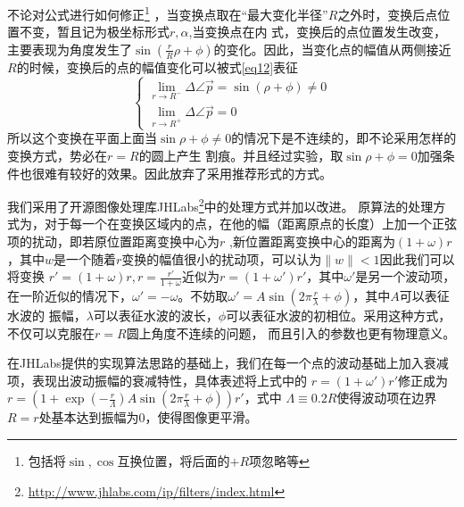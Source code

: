 \documentclass[UTF8,a4paper]{paper}\usepackage[utf8]{inputenc}\usepackage{algorithm}
\begin{document}
不论对公式进行如何修正\footnote{包括将$\sin,\cos$互换位置，将后面的$+R$项忽略等}
，当变换点取在“最大变化半径”$R$之外时，变换后点位置不变，暂且记为极坐标形式$r,\alpha$,当变换点在内
式，变换后的点位置发生改变，主要表现为角度发生了$\sin(\frac{r}{R}\rho + \phi)$的变化。因此，当变化点的幅值从两侧接近
$R$的时候，变换后的点的幅值变化可以被式\ref{eq12}表征
\begin{equation}\begin{cases}
    \displaystyle{\lim_{r\rightarrow R^-} \Delta \angle{\vec{p}} = \sin(\rho + \phi) \ne 0} \\
    \displaystyle{\lim_{r\rightarrow R^+} \Delta \angle{\vec{p}} = 0} 
\label{eq12}\end{cases}\end{equation}
所以这个变换在平面上面当$\sin{\rho + \phi} \ne 0$的情况下是不连续的，即不论采用怎样的变换方式，势必在$r = R$的圆上产生
割痕。并且经过实验，取$\sin{\rho + \phi} = 0$加强条件也很难有较好的效果。因此放弃了采用推荐形式的方式。

我们采用了开源图像处理库JHLabs\footnote{\url{http://www.jhlabs.com/ip/filters/index.html}}中的处理方式并加以改进。
原算法的处理方式为，对于每一个在变换区域内的点，在他的幅（距离原点的长度）上加一个正弦项的扰动，即若原位置距离变换中心为$r$
,新位置距离变换中心的距离为$(1+\omega)r$，其中$w$是一个随着$r$变换的幅值很小的扰动项，可以认为$\|w\| < 1$因此我们可以将变换
$r' = (1+\omega) r,r = \frac{r'}{1+\omega}$近似为$r = (1+\omega')r'$，其中$\omega'$是另一个波动项，
在一阶近似的情况下，$\omega' = -\omega$。不妨取$\omega' = A\sin(2\pi\frac{r}{\lambda}+\phi)$，其中$A$可以表征水波的
振幅，$\lambda$可以表征水波的波长，$\phi$可以表征水波的初相位。采用这种方式，不仅可以克服在$r=R$圆上角度不连续的问题，
而且引入的参数也更有物理意义。

在JHLabs提供的实现算法思路的基础上，我们在每一个点的波动基础上加入衰减项，表现出波动振幅的衰减特性，具体表述将上式中的
$r = (1 + \omega')r'$修正成为$r = (1 + \exp(-\frac{r}{\Lambda}) A\sin(2\pi\frac{r}{\lambda}+\phi))r'$，式中
$\Lambda \equiv 0.2R$使得波动项在边界$R = r$处基本达到振幅为0，使得图像更平滑。
\end{document}
